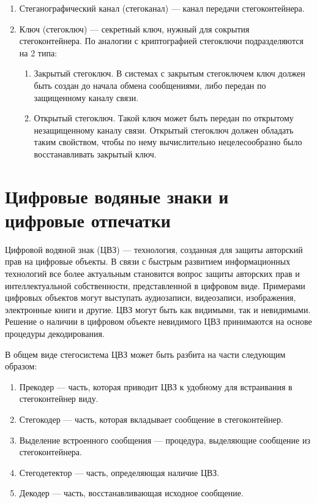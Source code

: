 \begin{enumerate}
\begin{enumerate}
    \end{enumerate}
    \item Стеганографический канал (стегоканал) --- канал передачи стегоконтейнера.
    \item Ключ (стегоключ) --- секретный ключ, нужный для сокрытия стегоконтейнера.
    По аналогии с криптографией стегоключи подразделяются на 2 типа:
    \begin{enumerate}
        \item Закрытый стегоключ.
        В системах с закрытым стегоключем ключ должен быть создан до начала обмена сообщениями,
        либо передан по защищенному каналу связи.
        \item Открытый стегоключ. Такой ключ может быть передан по открытому незащищенному каналу связи.
        Открытый стегоключ должен обладать таким свойством, чтобы по нему вычислительно нецелесообразно
        было восстанавливать закрытый ключ.
    \end{enumerate}
\end{enumerate}

\section{Цифровые водяные знаки и цифровые отпечатки}

Цифровой водяной знак (ЦВЗ) --- технология, созданная для защиты авторский прав на цифровые объекты.
В связи с быстрым развитием информационных технологий все более актуальным становится
вопрос защиты авторских прав и интеллектуальной собственности, представленной в цифровом виде.
Примерами цифровых объектов могут выступать аудиозаписи, видеозаписи, изображения, электронные книги и другие. 
ЦВЗ могут быть как видимыми, так и невидимыми. Решение о наличии в цифровом объекте невидимого ЦВЗ принимаются
на основе процедуры декодирования.

В общем виде стегосистема ЦВЗ может быть разбита на части следующим образом:
\begin{enumerate}
    \item Прекодер --- часть, которая приводит ЦВЗ к удобному для встраивания в стегоконтейнер виду.
    \item Стегокодер --- часть, которая вкладывает сообщение в стегоконтейнер.
    \item Выделение встроенного сообщения --- процедура, выделяющие сообщение из стегоконтейнера.
    \item Стегодетектор --- часть, определяющая наличие ЦВЗ.
    \item Декодер --- часть, восстанавливающая исходное сообщение.
\end{enumerate}

